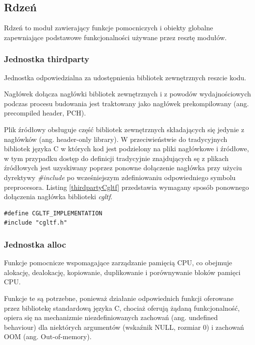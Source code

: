 \subsection{Rdzeń}

Rdzeń to moduł zawierający funkcje pomocniczych i obiekty globalne zapewniające podstawowe funkcjonalności używane przez resztę modułów.

\subsubsection{Jednostka thirdparty}
Jednostka odpowiedzialna za udostępnienia bibliotek zewnętrznych reszcie kodu.

Nagłówek dołącza nagłówki bibliotek zewnętrznych i z powodów wydajnościowych podczas procesu budowania jest traktowany jako nagłówek prekompilowany (ang. precompiled header, PCH).

Plik źródłowy obsługuje część bibliotek zewnętrznych składających się jedynie z nagłówków (ang. header-only library).
W przeciwieństwie do tradycyjnych bibliotek języka C w których kod jest podzielony na pliki nagłówkowe i źródłowe, w tym przypadku dostęp do definicji tradycyjnie znajdujących sę z plikach źródłowych jest uzyskiwany poprzez ponowne dołączenie nagłówka przy użyciu dyrektywy \textit{\#include} po wcześniejszym zdefiniowaniu odpowiedniego symbolu preprocesora.
Listing \ref{thirdpartyCgltf} przedstawia wymagany sposób ponownego dołączenia nagłówka biblioteki \textit{cgltf}.
\lstset{language=C}
\begin{lstlisting}[caption={Przykład dołączenia implementacji bibliteki \textit{cgltf}},captionpos=b,label={thirdpartyCgltf}]
#define CGLTF_IMPLEMENTATION
#include "cgltf.h"
\end{lstlisting}

\subsubsection{Jednostka alloc}
Funkcje pomocnicze wspomagające zarządzanie pamięcią CPU, co obejmuje alokację, dealokację, kopiowanie, duplikowanie i porównywanie bloków pamięci CPU.

Funkcje te są potrzebne, ponieważ działanie odpowiednich funkcji oferowane przez bibliotekę standardową języka C, chociaż oferują żądaną funkcjonalność, opiera się na mechanizmie niezdefiniowanych zachowań (ang. undefined behaviour) dla niektórych argumentów (wskaźnik NULL, rozmiar 0) i zachowań OOM (ang. Out-of-memory).

